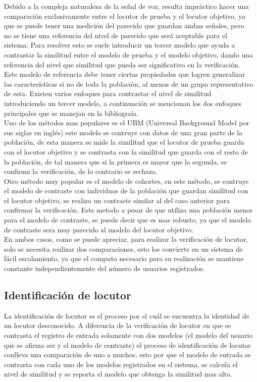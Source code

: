 Debido a la compleja naturaleza de la señal de voz, resulta impr\'actico hacer una comparaci\'on exclusivamente entre el locutor de prueba y el locutor objetivo, ya que se puede tener una medici\'on del parecido que guardan ambas señales, pero no se tiene una referencia del nivel de parecido que ser\'a aceptable para el sistema. Para resolver esto se suele introducir un tercer modelo que ayuda a contrastar la similitud entre el modelo de prueba y el modelo objetivo, dando una referencia del nivel que similitud que pueda ser significativo en la verificaci\'on. Este modelo de referencia debe tener ciertas propiedades que logren generalizar las caracter\'isticas si no de toda la poblaci\'on, al menos de un grupo representativo de esta. Existen varios enfoques para contrastar el nivel de similitud introduciendo un tercer modelo, a continuaci\'on se mencionan los dos enfoques principales que se manejan en la bibliogra\'ia.\\

Uno de los m\'etodos mas populares es el  UBM (Universal Background Model por sus siglas en ingl\'es) este modelo se contruye con datos de una gran parte de la poblaci\'on, de esta manera se mide la similitud que el locutor de prueba guarda con el locutor objetivo y se contrasta con la similitud que guarda con el resto de la poblaci\'on, de tal manera que si la primera es mayor que la segunda, se confirma la verificaci\'on, de lo contrario se rechaza.\\

Otro m\'etodo muy popular es el modelo de cohortes, en este m\'etodo, se contruye el modelo de contraste con  individuos de la poblaci\'on que guardan similitud con el locutor objetivo, se realiza un contraste similar al del caso anterior para confirmar la verificaci\'on. Este metodo a pesar de que utiliza una poblaci\'on menor para el modelo de contraste, se puede decir que es mas robusto, ya que el modelo de contraste sera muy parecido al modelo del locutor objetivo.\\

En ambos casos, como se puede apreciar, para realizar la verificaci\'on de locutor, solo se necesita realizar dos comparaciones, esto los convierte en un sistema de f\'acil escalamiento, ya que el computo necesario para su realizaci\'on se mantiene constante independientemente del n\'umero de usuarios registrados.\\

\subsection{Identificaci\'on de locutor}
La identificaci\'on de locutor es el proceso por el cu\'al se encuentra la identidad de un locutor desconocido. A diferencia de la verificaci\'on de locutor en que se contrasta el registro de entrada solamente con dos modelos (el modelo del usuario que se afirma ser y el modelo de contraste) el proceso de identificaci\'on de locutor conlleva una comparaci\'on de uno a muchos, esto por que el modelo de entrada se contrasta con cada uno de los modelos registrados en el sistema, se calcula el nivel de similitud y se reporta el modelo que obtenga la similitud mas alta.\\

